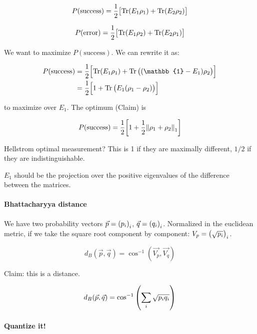 \begin{equation}
  P(\text{success}) = \frac{1}{2} \qty[\Tr(E_1 \rho_1) + \Tr(E_2 \rho_2)]
\end{equation}

\begin{equation}
  P(\text{error}) = \frac{1}{2} \qty[\Tr(E_1 \rho_2) + \Tr(E_2 \rho_1)]
\end{equation}

We want to maximize \(P(\text{success})\). We can rewrite it as:

\begin{align}
  P(\text{success}) &= \frac{1}{2} \qty[\Tr(E_1 \rho_1) + \Tr\qty((\mathbb{1} - E_1) \rho_2)] \\
  &= \frac{1}{2}\qty[1 + \Tr \qty(E_1 (\rho_1 - \rho_2))]
\end{align}

to maximize over $E_1$. The optimum (Claim) is

\begin{equation}
  P(\text{success}) = \frac{1}{2}\qty[1 + \frac{1}{2} \norm{\rho_1 + \rho_2}_1]
\end{equation}

Hellstrom optimal measurement?
This is 1 if they are maximally different, $1/2$ if they are indistinguishable.

$E_1$ should be the projection over the positive eigenvalues of the difference between the matrices.

\paragraph{Bhattacharyya distance}

We have two probability vectors \(\vec{p} = \qty(p_i)_i\), \(\vec{q} = \qty(q_i)_i\).
Normalized in the euclidean metric, if we take the square root component by component: \(V_p = \qty(\sqrt{p_i})_i\).

\begin{equation}
  d_B (\vec{p}, \vec{q}) = \cos^{-1} (\vec{V_p}, \vec{V_q})
\end{equation}

Claim: this is a distance.

\begin{equation}
  d_B (\vec{p}, \vec{q}) = \cos^{-1} \qty(\sum_i \sqrt{p_i q_i})
\end{equation}

\paragraph{Quantize it!}

